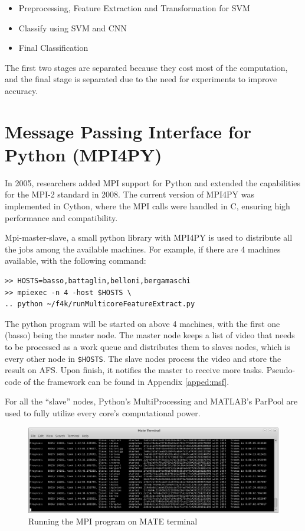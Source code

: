 \documentclass[bsc,logo,twoside,fullspacing,parskip]{infthesis}
\begin{document}
\begin{itemize}
   \setlength{\parskip}{0pt}
   \item Preprocessing, Feature Extraction and Transformation for SVM
   \item Classify using SVM and CNN
   \item Final Classification
\end{itemize}
The first two stages are separated because they cost most of the computation, and the final stage is separated due to the need for experiments to improve accuracy.

\section{Message Passing Interface for Python (MPI4PY)}

In 2005, researchers added MPI support for Python\cite{MPI4PY} and extended the capabilities for the MPI-2 standard in 2008\cite{MPI4PY2}. The current version of MPI4PY\cite{MPI4PY3} was implemented in Cython, where the MPI calls were handled in C, ensuring high performance and compatibility.

Mpi-master-slave\cite{L5}, a small python library with MPI4PY is used to distribute all the jobs among the available machines. 
For example, if there are 4 machines available, with the following command: 
\lstset{basicstyle=\footnotesize\ttfamily,breaklines=true}
\begin{lstlisting}[frame=single]
>> HOSTS=basso,battaglin,belloni,bergamaschi
>> mpiexec -n 4 -host $HOSTS \
.. python ~/f4k/runMulticoreFeatureExtract.py
\end{lstlisting}
The python program will be started on above 4 machines, with the first one (basso) being the master node.
The master node keeps a list of video that needs to be processed as a work queue and distributes them to slaves nodes, which is every other node in {\tt \$HOSTS}. 
The slave nodes process the video and store the result on AFS. Upon finish, it notifies the master to receive more tasks. Pseudo-code of the framework can be found in Appendix \ref{apped:msf}.

For all the ``slave'' nodes, Python's MultiProcessing and MATLAB's ParPool are used to fully utilize every core's computational power.

\begin{figure}
    \centering
    \includegraphics[scale=0.30]{graph/sample_terminal.png}
    \caption{Running the MPI program on MATE terminal}
    \label{fig:mpi}
\end{figure}
\end{document}

